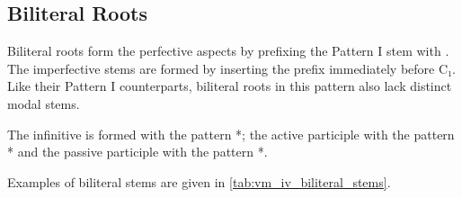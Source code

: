\documentclass[grammar]{subfiles}
\begin{document}
\subsection{Biliteral Roots}
\label{ssec:vm_iv_biliteral_roots}

Biliteral roots form the perfective aspects by prefixing the Pattern I stem
with .  The imperfective stems are formed by inserting the prefix
 immediately before C₁.  Like their Pattern I counterparts, biliteral
roots in this pattern also lack distinct modal stems. 

The infinitive is formed with the pattern *; the active participle
with the pattern * and the passive participle with the pattern
*. 

Examples of biliteral stems are given in \cref{tab:vm_iv_biliteral_stems}. 

\begin{table}[h!]\small\capstart
  \centering
  \\
  \caption{Pattern IV biliteral stems \label{tab:vm_iv_biliteral_stems}}
\end{table}
    
\end{document}
